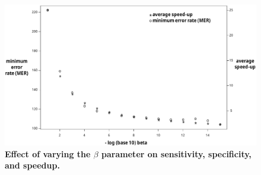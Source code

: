 \begin{figure}
\begin{center}
\includegraphics[width=6.4in]{figs/d5_beta_vs}
\caption{\textbf{Effect of varying the $\beta$ parameter on
    sensitivity, specificity, and speedup.}
}
\label{fig:betavaried}
\end{center}
\end{figure}
